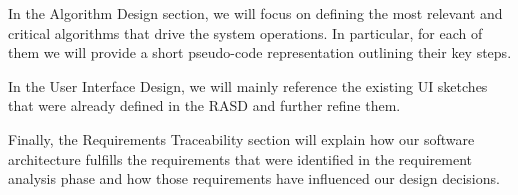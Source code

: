 In the Algorithm Design section, we will focus on defining the most relevant and critical algorithms that drive the system operations. In particular, for each of them we will provide a short pseudo-code representation outlining their key steps. 

In the User Interface Design, we will mainly reference the existing UI sketches that were already defined in the RASD and further refine them. 

Finally, the Requirements Traceability section will explain how our software architecture fulfills the requirements that were identified in the requirement analysis phase and how those requirements have influenced our design decisions. 
